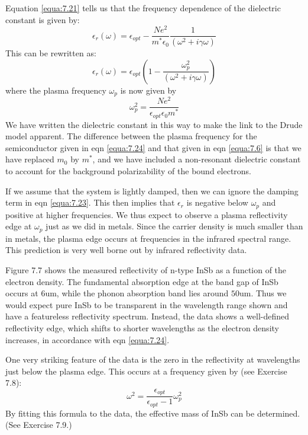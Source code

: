 \documentclass[12pt]{book}
\def\um{\mathrm{um}}
\begin{document}
Equation \ref{equa:7.21} tells us that the frequency dependence of the dielectric constant is given by:
\begin{equation}\label{equa:7.22}
  \epsilon_r(\omega)=\epsilon_{opt}-\frac{Ne^2}{m^*\epsilon_0}\frac{1}{(\omega^2+i\gamma\omega)}
\end{equation}
This can be rewritten as:
\begin{equation}\label{equa:7.23}
  \epsilon_r(\omega)=\epsilon_{opt}\left(1-\frac{\omega_p^2}{(\omega^2+i\gamma\omega)}\right)
\end{equation}
where the plasma frequency $\omega_p$ is now given by
\begin{equation}\label{equa:7.24}
  \omega_p^2=\frac{Ne^2}{\epsilon_{opt}\epsilon_0m^*}
\end{equation}
We have written the dielectric constant in this way to make the link to the Drude model apparent. The difference between the plasma frequency for the semiconductor given in eqn \ref{equa:7.24} and that given in eqn \ref{equa:7.6} is that we have replaced $m_0$ by $m^*$, and we have included a non-resonant dielectric constant to account for the background polarizability of the bound electrons.

If we assume that the system is lightly damped, then we can ignore the damping term in eqn \ref{equa:7.23}. This then implies that $\epsilon_r$ is negative below $\omega_p$ and positive at higher frequencies. We thus expect to observe a plasma reflectivity edge at $\omega_p$ just as we did in metals. Since the carrier density is much smaller than in metals, the plasma edge occurs at frequencies in the infrared spectral range. This prediction is very well borne out by infrared reflectivity data.

Figure 7.7 shows the measured reflectivity of n-type InSb as a function of the electron density. The fundamental absorption edge at the band gap of InSb occurs at $6\um$, while the phonon absorption band lies around $50\um$. Thus we would expect pure InSb to be transparent in the wavelength range shown and have a featureless reflectivity spectrum. Instead, the data shows a well-defined reflectivity edge, which shifts to shorter wavelengths as the electron density increases, in accordance with eqn \ref{equa:7.24}.

One very striking feature of the data is the zero in the reflectivity at wavelengths just below the plasma edge. This occurs at a frequency given by (see Exercise 7.8):
\begin{equation}\label{equa:7.25}
  \omega^2=\frac{\epsilon_{opt}}{\epsilon_{opt}-1}\omega_p^2
\end{equation}
By fitting this formula to the data, the effective mass of InSb can be determined. (See Exercise 7.9.)
\end{document}
